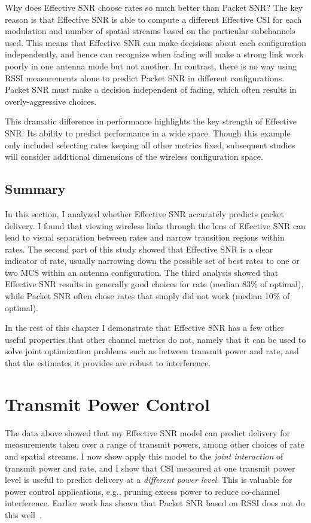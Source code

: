 Why does Effective SNR choose rates so much better than Packet SNR? The key reason is that Effective SNR is able to compute a different Effective CSI for each modulation and number of spatial streams based on the particular subchannels used. This means that Effective SNR can make decisions about each configuration independently, and hence can recognize when fading will make a strong link work poorly in one antenna mode but not another. In contrast, there is no way using RSSI measurements alone to predict Packet SNR in different configurations. Packet SNR must make a decision independent of fading, which often results in overly-aggressive choices.

This dramatic difference in performance highlights the key strength of Effective SNR: Its ability to predict performance in a wide space. Though this example only included selecting rates keeping all other metrics fixed, subsequent studies will consider additional dimensions of the wireless configuration space.

\subsection{Summary}
In this section, I analyzed whether Effective SNR accurately predicts packet delivery. I found that viewing wireless links through the lens of Effective SNR can lead to visual separation between rates and narrow transition regions within rates. The second part of this study showed that Effective SNR is a clear indicator of rate, usually narrowing down the possible set of best rates to one or two MCS within an antenna configuration. The third analysis showed that Effective SNR results in generally good choices for rate (median 83\% of optimal), while Packet SNR often chose rates that simply did not work (median 10\% of optimal).

In the rest of this chapter I demonstrate that Effective SNR has a few other useful properties that other channel metrics do not, namely that it can be used to solve joint optimization problems such as between transmit power and rate, and that the estimates it provides are robust to interference.

\section{Transmit Power Control}
\label{sec:tx_power_trim}
The data above showed that my Effective SNR model can predict delivery for measurements taken over a range of transmit powers, among other choices of rate and spatial streams. I now show apply this model to the \emph{joint interaction} of transmit power and rate, and I show that CSI measured at one transmit power level is useful to predict delivery at a \emph{different power level}. This is valuable for power control applications, e.g., pruning excess power to reduce co-channel interference. Earlier work has shown that Packet SNR based on RSSI does not do this well~\cite{Monks_PowerMAC,Ramachandran_Symphony,Son_PowerStudy}. 


